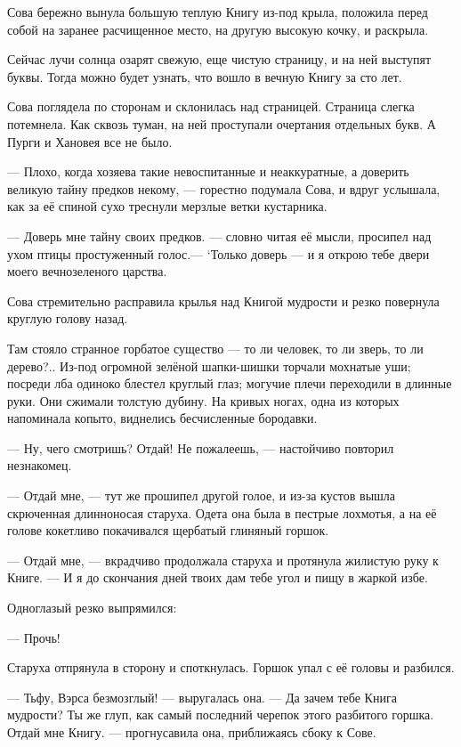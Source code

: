 \documentclass[oneside,final,14pt]{extreport}
\begin{document}
	Сова бережно вынула большую теплую Книгу из-под крыла, положила перед собой на заранее расчищенное место, на другую высокую кочку, и раскрыла.
	
	Сейчас лучи солнца озарят свежую, еще чистую страницу, и на ней выступят буквы. Тогда можно будет узнать, что вошло в вечную Книгу за сто лет.
	
	Сова поглядела по сторонам и склонилась над страницей. Страница слегка потемнела. Как сквозь туман, на ней проступали очертания отдельных букв. А Пурги и Хановея все не было.
	
	— Плохо, когда хозяева такие невоспитанные и неаккуратные, а доверить великую тайну предков некому, — горестно подумала Сова, и вдруг услышала, как за её спиной сухо треснули мерзлые ветки кустарника.
	
	— Доверь мне тайну своих предков. — словно читая её мысли, просипел над ухом птицы простуженный голос.— ‘Только доверь — и я открою тебе двери моего вечнозеленого царства.
	
	Сова стремительно расправила крылья над Книгой мудрости и резко повернула круглую голову назад.
	
	Там стояло странное горбатое существо — то ли человек, то ли зверь, то ли дерево?.. Из-под огромной зелёной шапки-шишки торчали мохнатые уши; посреди лба одиноко блестел круглый глаз; могучие плечи переходили в длинные руки. Они сжимали толстую дубину. На кривых ногах, одна из которых напоминала копыто, виднелись бесчисленные бородавки.
	
	— Ну, чего смотришь? Отдай! Не пожалеешь, — настойчиво повторил незнакомец.
	
	— Отдай мне, — тут же прошипел другой голое, и из-за кустов вышла скрюченная длинноносая старуха. Одета она была в пестрые лохмотья, а на её голове кокетливо покачивался щербатый глиняный горшок.
	
	— Отдай мне, — вкрадчиво продолжала старуха и протянула жилистую руку к Книге. — И я до скончания дней твоих дам тебе угол и пищу в жаркой избе.
	
	Одноглазый резко выпрямился:
	
	— Прочь!
	
	Старуха отпрянула в сторону и споткнулась. Горшок упал с её головы и разбился.
	
	— Тьфу, Вэрса безмозглый! — выругалась она. — Да зачем тебе Книга мудрости? Ты же глуп, как самый последний черепок этого разбитого горшка. Отдай мне Книгу. — прогнусавила она, приближаясь сбоку к Сове.
	
\end{document}
